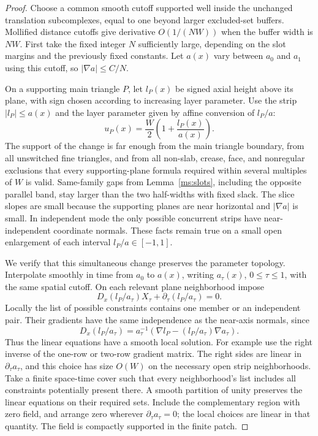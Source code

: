 \begin{proof}
Choose a common smooth cutoff supported well inside the unchanged
translation subcomplexes, equal to one beyond larger excluded-set
buffers.  Mollified distance cutoffs give derivative
$O(1/(NW))$ when the buffer width is $NW$.  First take the fixed
integer $N$ sufficiently large, depending on the slot margins and
the previously fixed constants.  Let $a(x)$ vary between $a_0$
and $a_1$ using this cutoff, so $|\nabla a|\le C/N$.

On a supporting main triangle $P$, let $l_P(x)$ be signed axial
height above its plane, with sign chosen according to increasing
layer parameter.  Use the strip $|l_P|\le a(x)$ and the layer
parameter given by affine conversion of $l_P/a$:
\begin{equation}
 u_P(x)=\frac W2\left(1+\frac{l_P(x)}{a(x)}\right).
 \label{ms:wide-parameter}
\end{equation}
The support of the change is far enough from the main triangle
boundary, from all unswitched fine triangles, and from all
non-slab, crease, face, and nonregular exclusions that every
supporting-plane formula required within several multiples of
$W$ is valid.  Same-family gaps from Lemma~\ref{ms:slots}, including
the opposite parallel band, stay larger than the two half-widths
with fixed slack.  The slice slopes are small because the
supporting planes are near horizontal and $|\nabla a|$ is small.
In independent mode the only possible concurrent strips have
near-independent coordinate normals.  These facts remain true
on a small open enlargement of each interval
$l_P/a\in[-1,1]$.

We verify that this simultaneous change preserves the parameter
topology.  Interpolate smoothly in time from $a_0$ to $a(x)$,
writing $a_\tau(x)$, $0\le\tau\le1$, with the same spatial
cutoff.  On each relevant plane neighborhood impose
\begin{equation}
 D_x(l_P/a_\tau)X_\tau
       +\partial_\tau(l_P/a_\tau)=0.
 \label{ms:material}
\end{equation}
Locally the list of possible constraints contains one member or
an independent pair.  Their gradients have the same independence
as the near-axis normals, since
\[
 D_x(l_P/a_\tau)
   =a_\tau^{-1}
       \left(\nabla l_P-(l_P/a_\tau)\nabla a_\tau\right).
\]
Thus the linear equations have a smooth local solution.  For
example use the right inverse of the one-row or two-row gradient
matrix.  The right sides are linear in $\partial_\tau a_\tau$,
and this choice has size $O(W)$ on the necessary open strip
neighborhoods.  Take a finite space-time cover such that every
neighborhood's list includes all constraints potentially present
there.  A smooth partition of unity preserves the linear
equations on their required sets.  Include the complementary
region with zero field, and arrange zero wherever
$\partial_\tau a_\tau=0$; the local choices are linear in that
quantity.  The field is compactly supported in the finite patch.


\end{proof}
